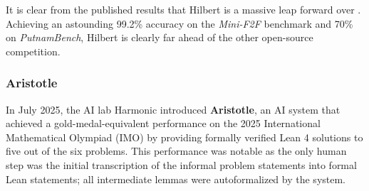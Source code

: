 \documentclass[12pt, letterpaper]{article}
\begin{document}
\medskip

It is clear from the published results that Hilbert is a massive leap forward over \citep{zhou2025solvingformalmathproblems}. Achieving an astounding 99.2\% accuracy on the \textit{Mini-F2F} benchmark and 70\% on \textit{PutnamBench}, {Hilbert} is clearly far ahead of the other open-source competition.



\subsubsection{Aristotle}
In July 2025, the AI lab Harmonic introduced \textbf{Aristotle}, an AI system that achieved a gold-medal-equivalent performance on the 2025 International Mathematical Olympiad (IMO) by providing formally verified Lean 4 solutions to five out of the six problems. This performance was notable as the only human step was the initial transcription of the informal problem statements into formal Lean statements; all intermediate lemmas were autoformalized by the system.
\end{document}

